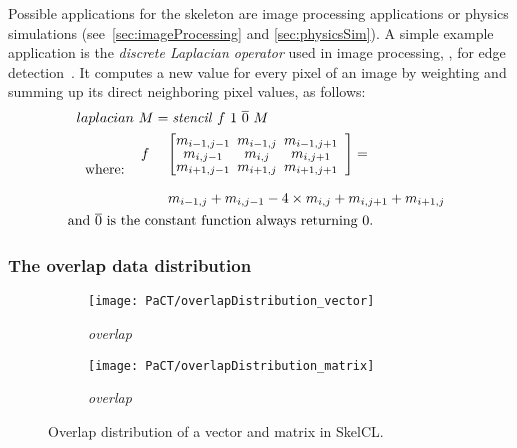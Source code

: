 Possible applications for the \stencil skeleton are image processing applications or physics simulations (see~\autoref{sec:imageProcessing} and \autoref{sec:physicsSim}).
A simple example application is the \emph{discrete Laplacian operator} used in image processing, \eg, for edge detection~\cite{Umbaugh1997}.
It computes a new value for every pixel of an image by weighting and summing up its direct neighboring pixel values, as follows:
\begin{align*}
  laplacian&\ M = \stencil\ f\ 1\ \overline{0}\ M\\
  \text{where:} \ \ &
  \begin{array}{ll}%
  f&\ \left[\begin{array}{ccc}%
      \hspace{-.5em} m_{i-1,j-1}& \hspace{-.5em} m_{i-1,j} & \hspace{-.5em}m_{i-1,j+1}\vspace{-.25em}\\%
      \hspace{-.5em} m_{i,j-1}  & \hspace{-.5em} m_{i,j}   & \hspace{-.5em}m_{i,j+1}  \vspace{-.25em}\\%
      \hspace{-.5em} m_{i+1,j-1}& \hspace{-.5em} m_{i+1,j} & \hspace{-.5em}m_{i+1,j+1}
    \end{array}\right] = \\[2em]
          &\ m_{i-1,j} + m_{i,j-1} - 4 \times m_{i,j} + m_{i,j+1} + m_{i+1,j}
  \end{array} \\
  \text{and } \overline{0} \text{ is th}&\text{e constant function always returning 0.}
\end{align*}

\subsubsection{The overlap data distribution}

\begin{figure}[tb]
  \centering
  \begin{subfigure}[b]{.3\textwidth}
    \texttt{[image: PaCT/overlapDistribution\_vector]}
    \caption{\emph{overlap}}
    \label{fig:overlap_distribution}
  \end{subfigure}
  \hspace{3em}
  \begin{subfigure}[b]{.22\textwidth}
    \texttt{[image: PaCT/overlapDistribution\_matrix]}
    \caption{\emph{overlap}}
    \label{fig:overlap_distribution:matrix}
  \end{subfigure}
  \caption{Overlap distribution of a vector and matrix in SkelCL.}
  \label{fig:overlap_distribution}
  \bigskip
\end{figure}

